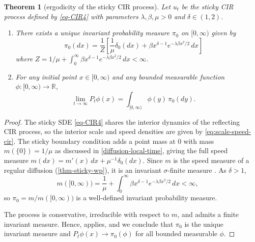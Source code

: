 \documentclass[aap,preprint]{imsart}
\numberwithin{equation}{section}
\theoremstyle{plain}
\newtheorem{theorem}{Theorem}[section]
\theoremstyle{definition}
\newtheorem{remark}[theorem]{Remark}
\begin{document}
\begin{theorem}[ergodicity of the sticky CIR
process]\label{thm-ergodicity}
Let \(u_t\) be the sticky CIR process defined by \cref{eq-CIR4}
with parameters \(\lambda, \beta, \mu > 0\) and \(\delta \in (1,2)\). 
\begin{enumerate}
\def\labelenumi{\arabic{enumi}.}
\item There exists a unique invariant
  probability measure \(\pi_0\) on \([0,\infty)\) given by \[
  \pi_0(dx) = \frac{1}{Z} \left[ \frac{1}{\mu} \delta_0(dx) + \beta x^{\delta-1} e^{-\lambda\beta x^2/2} \, dx \right]
  \] where $Z = 1/{\mu} + \int_0^\infty \beta x^{\delta-1}
e^{-\lambda\beta x^2/2}\,dx<\infty$.
\item For any initial point \(x \in [0,\infty)\) and
  any bounded measurable function \(\phi\colon [0,\infty)\to \mathbb{R}\), \[
  \lim_{t \to \infty} P_t\phi(x) = \int_{[0,\infty)} \phi(y) \, \pi_0(dy).
  \]
\end{enumerate}
\end{theorem}
%
\begin{proof}
  The sticky SDE \eqref{eq-CIR4} shares the interior dynamics of the reflecting CIR process, so the interior scale and speed densities are given by \cref{eq:scale-speed-cir}.
  The sticky boundary condition adds a point mass at $0$ with mass
  $m(\{0\}) = 1/\mu$ as discussed in \cref{diffusion-local-time},
  giving the full speed measure $m(dx) = m'(x)\,dx + \mu^{-1}\delta_0(dx)$.
   Since $m$ is the speed measure of a regular diffusion (\cref{thm-sticky-wp}), it is an invariant
  $\sigma$-finite measure \citep[Chapter~V]{RevuzYor1999}.  As $\delta>1$,
  \[
    m([0,\infty)) = \frac{1}{\mu}
    + \int_0^\infty \beta x^{\delta-1} e^{-\lambda\beta x^2/2}\,dx < \infty,
  \]
  so $\pi_0 = m/m([0,\infty))$ is a well-defined invariant probability measure.

  The process is conservative, irreducible with respect to $m$, and admits a
  finite invariant measure. Hence, \citet[Theorem~10.0.1]{MeynTweedie1993} applies, and we conclude that $\pi_0$ is the unique invariant measure and $P_t\phi(x)\to\pi_0(\phi)$
  for all bounded measurable $\phi$.
  \end{proof}

\end{document}

